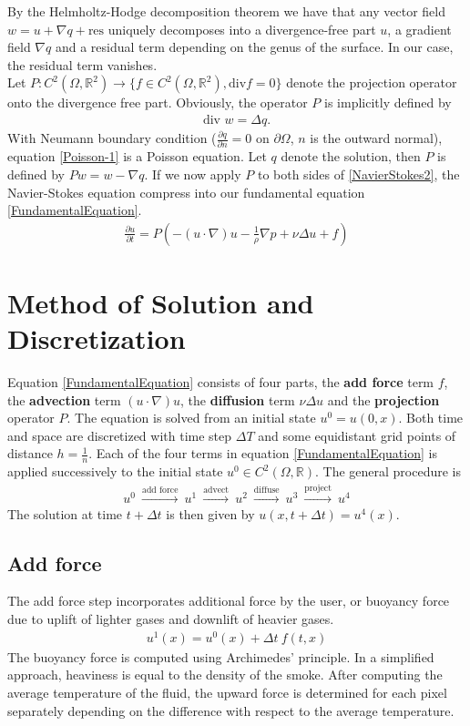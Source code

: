 \documentclass[a4paper,10pt,oneside,final,german,openbib,pdftex,titlepage]{scrbook}
\begin{document}
By the Helmholtz-Hodge decomposition theorem we have that any vector field $w = u + \nabla q + \text{res}$ uniquely decomposes into a divergence-free part $u$, a gradient field $\nabla q$ and a residual term depending on the genus of the surface. In our case, the residual term vanishes.\\

Let $P : C^2(\Omega,\mathbb{R}^2) \rightarrow \{f\in C^2(\Omega, \mathbb{R}^2), \text{div} f = 0\}$ denote the projection operator onto the divergence free part. Obviously, the operator $P$ is implicitly defined by 
\begin{align}
	\text{div } w = \Delta q. \label{Poisson-1}
\end{align}
With Neumann boundary condition ($\frac{\partial q}{\partial n} = 0$ on $\partial \Omega$, $n$ is the outward normal), equation \ref{Poisson-1} is a Poisson equation. Let $q$ denote the solution, then $P$ is defined by $Pw = w - \nabla q$. 
If we now apply $P$ to both sides of \ref{NavierStokes2}, the Navier-Stokes equation compress into our fundamental equation \ref{FundamentalEquation}.
\begin{align}
	\frac{\partial u}{\partial t} = P \left(- (u \cdot \nabla)u - \frac{1}{\rho}\nabla p + \nu \Delta u + f \right) \label{FundamentalEquation}
\end{align}
\section{Method of Solution and Discretization}
Equation \ref{FundamentalEquation} consists of four parts, the \textbf{add force} term $f$, the \textbf{advection} term $(u\cdot \nabla )u$, the \textbf{diffusion} term $\nu \Delta u$ and the \textbf{projection} operator $P$. The equation is solved from an initial state $u^0 = u(0,x)$. Both time and space are discretized with time step $\Delta T$ and some equidistant grid points of distance $h= \frac{1}{n}$.
Each of the four terms in equation \ref{FundamentalEquation} is applied successively to the initial state $u^0 \in C^2(\Omega,\mathbb{R})$. The general procedure is
\begin{align*}
	u^0 ~\overset{\text{add force}}{\longrightarrow}~ u^1 ~ \overset{\text{advect}}{\longrightarrow}~ u^2 ~\overset{\text{diffuse}}{\longrightarrow} ~u^3~ \overset{\text{project}}{\longrightarrow} ~u^4
\end{align*}
The solution at time $t+\Delta t$ is then given by $u(x,t+\Delta t) = u^4(x)$.
\subsection{Add force}
The add force step incorporates additional force by the user, or buoyancy force due to uplift of lighter gases and downlift of heavier gases.
\begin{align*}
	u^1(x) = u^0(x) + \Delta t~ f(t,x)
\end{align*}
The buoyancy force is computed using Archimedes' principle. In a simplified approach, heaviness is equal to the density of the smoke. After computing the average temperature of the fluid, the upward force is determined for each pixel separately depending on the difference with respect to the average temperature.
\end{document}
